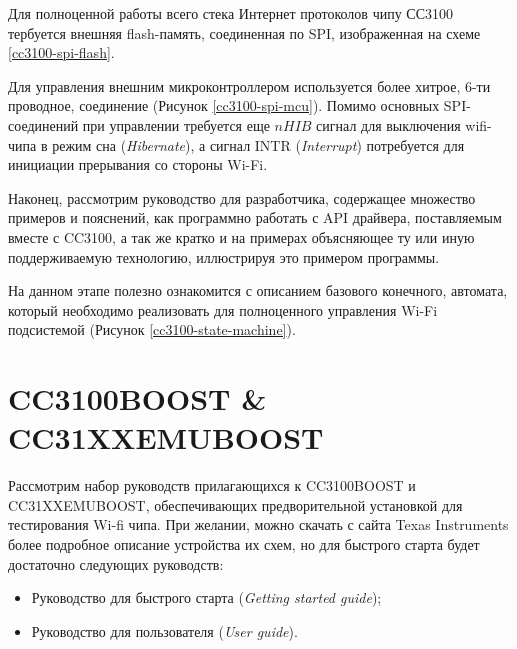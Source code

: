 Для полноценной работы всего стека Интернет протоколов
чипу СС3100 тербуется внешняя flash-память, соединенная
по SPI, изображенная на схеме \ref{cc3100-spi-flash}.


Для управления внешним микроконтроллером используется более
хитрое, 6-ти проводное, соединение (Рисунок \ref{cc3100-spi-mcu}).
Помимо основных SPI-соединений при управлении требуется еще
$nHIB$ сигнал для выключения wifi-чипа в режим сна (\textit{Hibernate}),
а сигнал INTR (\textit{Interrupt}) потребуется для инициации прерывания со стороны
Wi-Fi.


Наконец, рассмотрим руководство для разработчика, содержащее
множество примеров и пояснений, как программно работать с
API драйвера, поставляемым вместе с CC3100, а так же кратко
и на примерах объясняющее ту или иную поддерживаемую технологию,
иллюстрируя это примером программы.

На данном этапе полезно ознакомится с описанием базового конечного,
автомата, который необходимо реализовать для полноценного управления
Wi-Fi подсистемой (Рисунок \ref{cc3100-state-machine}).


\clearpage

\section{CC3100BOOST \& CC31XXEMUBOOST}

Рассмотрим набор руководств прилагающихся к CC3100BOOST и CC31XXEMUBOOST,
обеспечивающих предворительной установкой для тестирования Wi-fi чипа.
При желании, можно скачать с сайта Texas Instruments более подробное
описание устройства их схем, но для быстрого старта будет достаточно
следующих руководств:

\begin{itemize}
    \item Руководство для быстрого старта (\textit{Getting started guide})\cite{cc3100boostgetstart};
    \item Руководство для пользователя (\textit{User guide})\cite{cc3100boostuserguide}.
\end{itemize}


